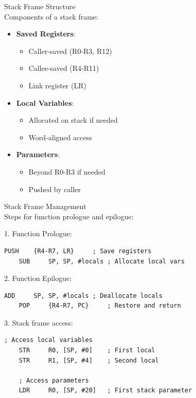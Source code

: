\begin{definition}{Stack Frame Structure}\\
Components of a stack frame:
\begin{itemize}
  \item \textbf{Saved Registers}:
    \begin{itemize}
      \item Caller-saved (R0-R3, R12)
      \item Callee-saved (R4-R11)
      \item Link register (LR)
    \end{itemize}
  \item \textbf{Local Variables}:
    \begin{itemize}
      \item Allocated on stack if needed
      \item Word-aligned access
    \end{itemize}
  \item \textbf{Parameters}:
    \begin{itemize}
      \item Beyond R0-R3 if needed
      \item Pushed by caller
    \end{itemize}
\end{itemize}

\end{definition}

\begin{KR}{Stack Frame Management}\\
Steps for function prologue and epilogue:

1. Function Prologue:
\begin{lstlisting}[language=armasm, style=basesmol]
    PUSH    {R4-R7, LR}     ; Save registers
    SUB     SP, SP, #locals ; Allocate local vars
\end{lstlisting}

2. Function Epilogue:
\begin{lstlisting}[language=armasm, style=basesmol]
    ADD     SP, SP, #locals ; Deallocate locals
    POP     {R4-R7, PC}     ; Restore and return
\end{lstlisting}

3. Stack frame access:
\begin{lstlisting}[language=armasm, style=basesmol]
    ; Access local variables
    STR     R0, [SP, #0]    ; First local
    STR     R1, [SP, #4]    ; Second local
    
    ; Access parameters
    LDR     R0, [SP, #20]   ; First stack parameter
\end{lstlisting}
\end{KR}

